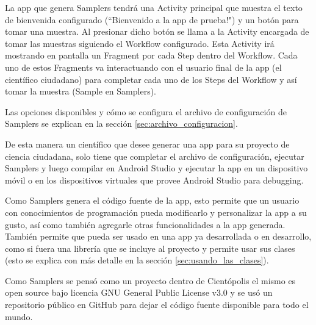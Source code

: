 La app que genera Samplers tendrá una Activity principal que muestra el texto de bienvenida configurado (``Bienvenido a la app de prueba!") y un botón para tomar una muestra. Al presionar dicho botón se llama a la Activity encargada de tomar las muestras siguiendo el Workflow configurado. Esta Activity irá mostrando en pantalla un Fragment por cada Step dentro del Workflow. Cada uno de estos Fragments va interactuando con el usuario final de la app (el científico ciudadano) para completar cada uno de los Steps del Workflow y así tomar la muestra (Sample en Samplers).

Las opciones disponibles y cómo se configura el archivo de configuración de Samplers se explican en la sección \ref{sec:archivo_configuracion}.

De esta manera un científico que desee generar una app para su proyecto de ciencia ciudadana, solo tiene que completar el archivo de configuración, ejecutar Samplers y luego compilar en Android Studio y ejecutar la app en un dispositivo móvil o en los dispositivos virtuales que provee Android Studio para debugging.

Como Samplers genera el código fuente de la app, esto permite que un usuario con conocimientos de programación pueda modificarlo y personalizar la app a su gusto, así como también agregarle otras funcionalidades a la app generada. También permite que pueda ser usado en una app ya desarrollada o en desarrollo, como si fuera una librería que se incluye al proyecto y permite usar sus clases (esto se explica con más detalle en la sección \ref{sec:usando_las_clases}).

Como Samplers se pensó como un proyecto dentro de Cientópolis\cite{cientopolis} el mismo es open source bajo licencia GNU General Public License v3.0 y se usó un repositorio público en GitHub\cite{github} para dejar el código fuente disponible para todo el mundo.

